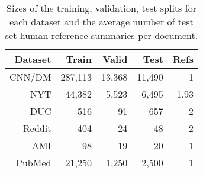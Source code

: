 \begin{table}
    \center
    \begin{tabular}{ r  r r r r }
      \toprule
      \textbf{Dataset} & \textbf{Train} & \textbf{Valid} & \textbf{Test} &
        \textbf{Refs} \\
      \midrule
      CNN/DM & 287,113 & 13,368 & 11,490 & 1\\
      NYT & 44,382 & 5,523 & 6,495 & 1.93\\
      DUC & 516 & 91 & 657 & 2 \\
      Reddit & 404 & 24 & 48 & 2 \\
      AMI & 98 & 19 & 20 & 1 \\
      PubMed & 21,250 & 1,250 & 2,500 & 1\\
      \bottomrule
    \end{tabular}
   \caption{Sizes of the training, validation, test splits for each dataset
   and the average number of test set human reference summaries per document.}
   \label{tab:data}
\end{table}


